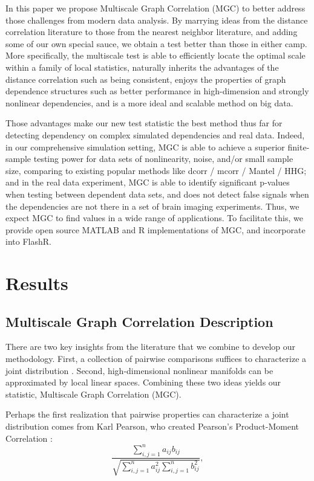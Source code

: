 \documentclass[11pt]{article}
\begin{document}
In this paper we propose Multiscale Graph Correlation (MGC) to better address those challenges from modern data analysis. By marrying ideas from the distance correlation literature to those from the nearest neighbor literature, and adding some of our own special sauce, we obtain a test better than those in either camp.  More specifically,  the multiscale test is able to efficiently locate the optimal scale within a family of local statistics, naturally inherits the advantages of the distance correlation such as being consistent, enjoys the properties of graph dependence structures such as better performance in high-dimension and strongly nonlinear dependencies, and is a more ideal and scalable method on big data. 

Those advantages make our new test statistic the best method thus far for detecting dependency on complex simulated dependencies and real data. Indeed, in our comprehensive simulation setting, MGC is able to achieve a superior finite-sample testing power for data sets of nonlinearity, noise, and/or small sample size, comparing to existing popular methods like dcorr / mcorr / Mantel / HHG; and in the real data experiment, MGC is able to identify significant p-values when testing between dependent data sets,  and does not detect false signals when the dependencies are not there in a set of brain imaging experiments. Thus, we expect MGC to find values in a wide range of applications.  To facilitate this, we provide open source MATLAB and R implementations of MGC, and incorporate into FlashR.

\section{Results}
\label{main}
\subsection{Multiscale Graph Correlation Description}
\label{main1}
There are two key insights from the literature that we combine to develop our methodology.  First, a collection of pairwise comparisons  suffices to characterize a joint distribution \cite{Maa1996}.  Second, high-dimensional nonlinear manifolds can be approximated by local linear spaces.  Combining these two ideas yields our statistic,  Multiscale Graph Correlation (MGC).  

Perhaps the first realization that pairwise properties can characterize a joint distribution comes from  Karl Pearson, who created Pearson's Product-Moment Correlation \cite{Pearson1895}:
\begin{equation}
\label{generalCoef}
\frac{\sum_{i,j=1}^n a_{ij} b_{ij}}{\sqrt{\sum_{i,j=1}^n  a_{ij}^{2} \sum_{i,j=1}^n b_{ij}^{2}}}, 
\end{equation}
\end{document}
